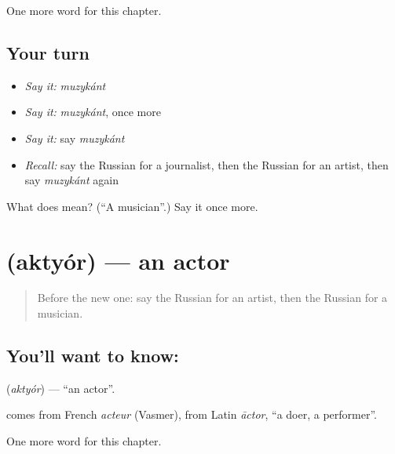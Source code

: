 \begin{grammarlens}[title={What you've built}]
One more word for this chapter.
\end{grammarlens}

\subsection*{Your turn}
\begin{itemize}
\raggedright
  \item \emph{Say it:} \emph{muzykánt}
  \item \emph{Say it:} \emph{muzykánt}, once more
  \item \emph{Say it:} say \emph{muzykánt}
  \item \emph{Recall:} say the Russian for a journalist, then the Russian for an artist, then say \emph{muzykánt} again
\end{itemize}

\begin{tcolorbox}[breakable,colback=teal!4,colframe=teal!35!black,title={Before you move on}]
What does  mean? (\textquotedblleft{}A musician\textquotedblright{}.) Say it once more.
\end{tcolorbox}
\section[\texorpdfstring{\ru{актёр} (aktyór)}{актёр (aktyór)}]{ (aktyór) — an actor}

\label{lesson:RU-C256-aktyor}



\begin{quote}
Before the new one: say the Russian for an artist, then the Russian for a musician.
\end{quote}

\subsection*{You'll want to know: }
\textbf{} (\emph{aktyór}) — \textquotedblleft{}an actor\textquotedblright{}.

\begin{cousinweb}
\textbf{} comes from French \emph{acteur} (Vasmer), from Latin \emph{āctor}, \textquotedblleft{}a doer, a performer\textquotedblright{}.
\end{cousinweb}

\begin{grammarlens}[title={What you've built}]
One more word for this chapter.
\end{grammarlens}

